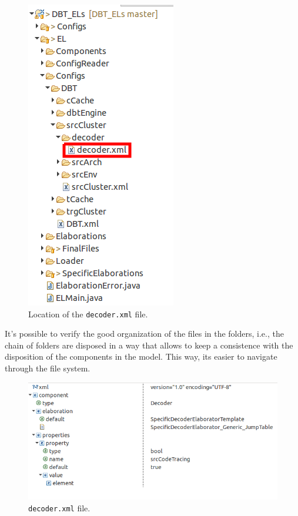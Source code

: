 \begin{figure}[H]
\centerline{
\includegraphics[scale=0.38]{images/decoder}
}
\caption{Location of the \texttt{decoder.xml} file.}
\label{fig:decoder_xml} 
\end{figure}

It's possible to verify the good organization of the files in the folders, i.e., the chain of folders are disposed in a way that allows to keep a consistence with the disposition of the components in the model. This way, its easier to navigate through the file system.

\begin{figure}[H]
\centerline{
\includegraphics[scale=0.38]{images/decoder2}
}
\caption{\texttt{decoder.xml} file.}
\label{fig:decoder_xml2} 
\end{figure}
 
